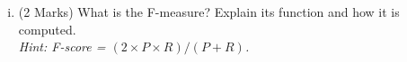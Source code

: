 \documentclass[a4paper,12pt]{article}
\begin{document}
\begin{enumerate}
\begin{enumerate}[(i)]
\item (2 Marks) What is the F-measure? Explain its function and how it is computed.\\ 
\noindent \textit{ Hint: F-score = $(2 \times P \times R) / (P + R)$.}
\end{enumerate}


%
%
%
%	

\medskip


\end{enumerate}
\end{document}
